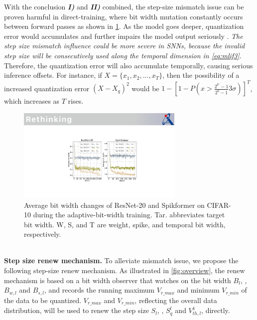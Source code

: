
With the conclusion \emph{\textbf{I)}} and \emph{\textbf{II)}} combined, 
the step-size mismatch issue can be proven  harmful in direct-training, where bit width mutation constantly occurs between forward passes as shown in  \cref{fig:bit detect}. As the model goes deeper, quantization error would accumulates and further impairs the model output seriously \cite{sengupta2019going}. \emph{The step size mismatch influence could be more severe in SNNs, because the invalid step size will be consecutively used along the temporal dimension in  \cref{eq:mlif3}.} Therefore, the quantization error will also accumulate temporally, causing serious inference offsets. For instance, if $X = \{x_1, x_2,...,x_T\}$, then the possibility of a increased quantization error $(X-X_q)^2$ would be $1-[1-P(x>\frac{2^{b'}-1}{2^b-1}3\sigma)]^T$, which increases as $T$ rises. 
\begin{figure}[t]
  \centering
  \includegraphics[width= 8cm]{figs/bit detect.pdf}
  \caption{Average bit width changes of ResNet-20 and Spikformer on CIFAR-10 during the adaptive-bit-width training. Tar. abbreviates target bit width. W, S, and T are weight, spike, and temporal bit width, respectively.
  }
  \label{fig:bit detect}
\end{figure}
\\\textbf{Step size renew mechanism.} To alleviate mismatch issue, we propose the following step-size renew mechanism. 
As illustrated in  \cref{fig:overview},
the renew mechanism is based on a bit width observer that watches on the bit width $B_l$, \eg, $B_{w,l}$ and $B_{s,l}$, and records the running maximum $V_{r\_max}$ and minimum $V_{r\_min}$ of the  data to be quantized. $V_{r\_max}$ and $V_{r\_min}$, reflecting the overall data distribution, will be used to renew the step size $S_l$, \eg, $S_q^l$ and $V_{th,l}^1$, directly.


